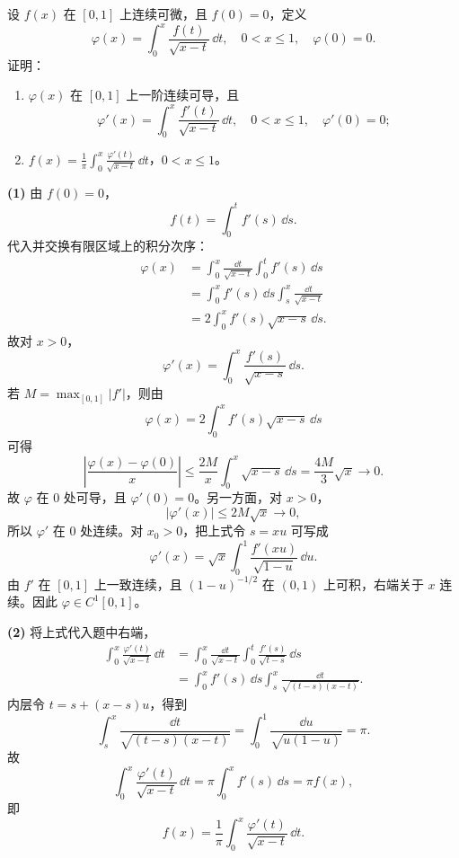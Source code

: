 \begin{xreferenceproblem}[3]
设 $f(x)$ 在 $[0,1]$ 上连续可微，且 $f(0)=0$，定义
  \[
    \varphi(x)=\int_0^x\frac{f(t)}{\sqrt{x-t}}\,\dd t,\quad0<x\leqslant1,\quad\varphi(0)=0.
  \]
  证明：
  \begin{enumerate}[label=(\arabic*)]
    \item $\varphi(x)$ 在 $[0,1]$ 上一阶连续可导，且
    \[
      \varphi'(x)=\int_0^x\frac{f'(t)}{\sqrt{x-t}}\,\dd t,\quad0<x\leqslant1,\quad\varphi'(0)=0;
    \]
    \item $\displaystyle f(x)=\frac1\pi\int_0^x\frac{\varphi'(t)}{\sqrt{x-t}}\,\dd t$，$0<x\leqslant1$。
  \end{enumerate}
\end{xreferenceproblem}
\begin{xsolution}
\textbf{(1)} 由 $f(0)=0$，
\[
f(t)=\int_0^t f'(s)\,\dd s.
\]
代入并交换有限区域上的积分次序：
\[
\begin{aligned}
\varphi(x)
&=\int_0^x\frac{\dd t}{\sqrt{x-t}}
\int_0^t f'(s)\,\dd s\\
&=\int_0^x f'(s)\,\dd s
\int_s^x\frac{\dd t}{\sqrt{x-t}}\\
&=2\int_0^x f'(s)\sqrt{x-s}\,\dd s.
\end{aligned}
\]
故对 $x>0$，
\[
\boxed{
\varphi'(x)=\int_0^x\frac{f'(s)}{\sqrt{x-s}}\,\dd s.}
\]
若 $M=\max_{[0,1]}|f'|$，则由
\[
\varphi(x)=2\int_0^x f'(s)\sqrt{x-s}\,\dd s
\]
可得
\[
\left|\frac{\varphi(x)-\varphi(0)}x\right|
\leqslant\frac{2M}{x}\int_0^x\sqrt{x-s}\,\dd s
=\frac{4M}{3}\sqrt x\to0.
\]
故 $\varphi$ 在 $0$ 处可导，且 $\varphi'(0)=0$。另一方面，对 $x>0$，
\[
|\varphi'(x)|\leqslant2M\sqrt x\to0,
\]
所以 $\varphi'$ 在 $0$ 处连续。对 $x_0>0$，把上式令 $s=xu$ 可写成
\[
\varphi'(x)=\sqrt x\int_0^1\frac{f'(xu)}{\sqrt{1-u}}\,\dd u.
\]
由 $f'$ 在 $[0,1]$ 上一致连续，且 $(1-u)^{-1/2}$ 在 $(0,1)$ 上可积，右端关于 $x$ 连续。因此 $\varphi\in C^1[0,1]$。

\textbf{(2)} 将上式代入题中右端，
\[
\begin{aligned}
\int_0^x\frac{\varphi'(t)}{\sqrt{x-t}}\,\dd t
&=\int_0^x\frac{\dd t}{\sqrt{x-t}}
\int_0^t\frac{f'(s)}{\sqrt{t-s}}\,\dd s\\
&=\int_0^x f'(s)\,\dd s
\int_s^x\frac{\dd t}{\sqrt{(t-s)(x-t)}}.
\end{aligned}
\]
内层令 $t=s+(x-s)u$，得到
\[
\int_s^x\frac{\dd t}{\sqrt{(t-s)(x-t)}}
=\int_0^1\frac{\dd u}{\sqrt{u(1-u)}}=\pi.
\]
故
\[
\int_0^x\frac{\varphi'(t)}{\sqrt{x-t}}\,\dd t
=\pi\int_0^x f'(s)\,\dd s=\pi f(x),
\]
即
\[
\boxed{
f(x)=\frac1\pi\int_0^x\frac{\varphi'(t)}{\sqrt{x-t}}\,\dd t.}
\]
\end{xsolution}


